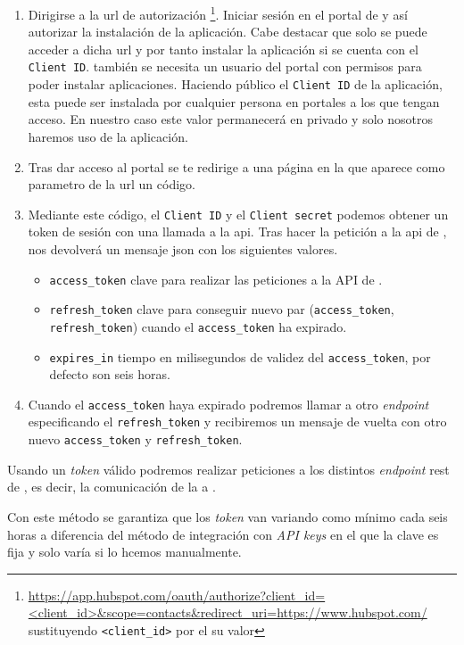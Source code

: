 \begin{enumerate}
	\item Dirigirse a la url de autorización \footnote{\url{https://app.hubspot.com/oauth/authorize?client_id=<client_id>&scope=contacts&redirect_uri=https://www.hubspot.com/} sustituyendo \texttt{<client\_id>} por el su valor}.
	Iniciar sesión en el portal de \hs{} y así autorizar la instalación de la aplicación. Cabe destacar que solo se puede acceder a dicha url y por tanto instalar la aplicación si se cuenta con el \texttt{Client ID}. también se necesita un usuario del portal con permisos para poder instalar aplicaciones.
	Haciendo público el \texttt{Client ID} de la aplicación, esta puede ser instalada por cualquier persona en portales a los que tengan acceso. En nuestro caso este valor permanecerá en privado y solo nosotros haremos uso de la aplicación.
		
	\item Tras dar acceso al portal se te redirige a una página en la que aparece como parametro de la url un código.
	\item Mediante este código, el \texttt{Client ID} y el \texttt{Client secret} podemos obtener un token de sesión con una llamada a la \acrshort{api}.
	Tras hacer la petición a la \acrshort{api} de \hs{}, nos devolverá un mensaje \acrshort{json} con los siguientes valores.
		\begin{itemize}
			\item \texttt{access\_token} clave para realizar las peticiones a la API de \hs.
			\item \texttt{refresh\_token} clave para conseguir nuevo par (\texttt{access\_token}, \texttt{refresh\_token}) cuando el \texttt{access\_token} ha expirado.
			\item \texttt{expires\_in} tiempo en milisegundos de validez del \texttt{access\_token}, por defecto son seis horas.
		\end{itemize}
	\item Cuando el \texttt{access\_token} haya expirado podremos llamar a otro \textit{endpoint} especificando el \texttt{refresh\_token} y recibiremos un mensaje de vuelta con otro nuevo \texttt{access\_token} y \texttt{refresh\_token}.
\end{enumerate}

Usando un \textit{token} válido podremos realizar peticiones a los distintos \textit{endpoint} \acrshort{rest} de \hs{}, es decir, la comunicación de la \iface{} a \hs{}.

Con este método se garantiza que los \textit{token} van variando como mínimo cada seis horas a diferencia del método de integración con \textit{API keys} en el que la  clave es fija y solo varía si lo hcemos manualmente. 

